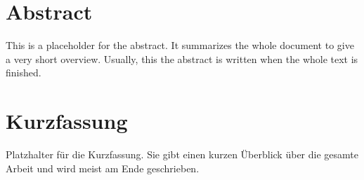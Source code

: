 \chapter*{Abstract}
\label{cha:abstract}


This is a placeholder for the abstract. It summarizes the whole document
to give a very short overview. Usually, this the abstract is written
when the whole text is finished.


\clearpage

\chapter*{Kurzfassung}
\label{cha:kurzfassung}

Platzhalter für die Kurzfassung. Sie gibt einen kurzen Überblick
über die gesamte Arbeit und wird meist am Ende geschrieben. 



